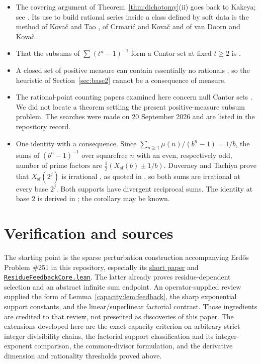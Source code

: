 \documentclass[11pt]{article}
\begin{document}
\begin{itemize}
\item The covering argument of Theorem~\ref{thm:dichotomy}(ii) goes back to Kakeya; see
  \cite{hornich1941,nitecki2013,fridy1966}.  Its use to build rational series
  inside a class defined by soft data is the method of Kova\v{c} and Tao
  \cite{kovactao2024}, of Crmari\'{c} and Kova\v{c} \cite{crmarickovac2025} and
  of van Doorn and Kova\v{c} \cite{vandoornkovac2025}.
\item That the subsums of $\sum(t^n-1)^{-1}$ form a Cantor set at fixed
  $t\ge2$ is \cite[Remark~4.1]{kovactao2024}.
\item A closed set of positive measure can contain essentially no rationals
  \cite{boesdarsterdos1981}, so the heuristic of Section~\ref{sec:base2} cannot be
  a consequence of measure.
\item The rational-point counting papers examined here concern null Cantor
  sets \cite{rstw2019,chowvarjuyu2024}.  We did not locate a theorem settling
  the present positive-measure subsum problem.  The searches were made on
  20 September 2026 and are listed in the repository record.
\item One identity with a consequence.  Since
  $\sum_{n\ge1}\mu(n)/(b^n-1)=1/b$, the sums of $(b^n-1)^{-1}$ over squarefree
  $n$ with an even, respectively odd, number of prime factors are
  $\tfrac12(X_{\mathrm{sf}}(b)\pm1/b)$.  Duverney and Tachiya prove that
  $X_{\mathrm{sf}}(2^j)$ is irrational \cite[Corollary~1.2 and
  Example~1.1]{duverneytachiya}, as quoted in \cite[Section~6]{plectis257}, so
  both sums are irrational at every base $2^j$.  Both supports have divergent
  reciprocal sums.  The identity at base $2$ is derived in
  \cite[Section~5]{plectis249}; the corollary may be known.
\end{itemize}


\section{Verification and sources}\label{capacity:sec:sources}
The starting point is the sparse perturbation construction accompanying
Erd\H{o}s Problem \#251 in this repository, especially its
\href{\repobase/paper/251/erdos-251-prime-gap-dyadic-series.pdf}{short paper} and
\href{\repobase/lean/ErdosProblems/Erdos251/ResidueFeedbackCore.lean}{\texttt{ResidueFeedbackCore.lean}}.
The latter already proves residue-dependent selection and an abstract infinite
sum endpoint. An operator-supplied review supplied the form of
Lemma~\ref{capacity:lem:feedback}, the sharp exponential support constants, and the
linear/superlinear factorial contrast. Those ingredients are credited to that
review, not presented as discoveries of this paper. The extensions developed here are the exact capacity criterion on arbitrary
strict integer divisibility chains, the factorial support classification and
its integer-exponent comparison, the common-divisor formulation, and the
derivative dimension and rationality thresholds proved above.
\end{document}
